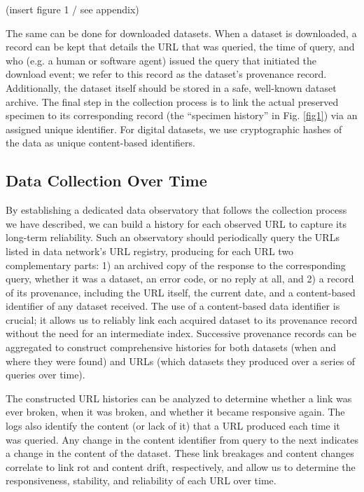 \documentclass[12pt,letterpaper]{article}
\begin{document}
% 
(insert figure 1 / see appendix)

The same can be done for downloaded datasets. When a dataset is downloaded, a record can be kept that details the URL that was queried, the time of query, and who (e.g. a human or software agent) issued the query that initiated the download event; we refer to this record as the dataset’s provenance record. Additionally, the dataset itself should be stored in a safe, well-known dataset archive. The final step in the collection process is to link the actual preserved specimen to its corresponding record (the “specimen history” in Fig. \ref{fig1}) via an assigned unique identifier. For digital datasets, we use cryptographic hashes of the data as unique content-based identifiers.

\subsection*{Data Collection Over Time}

By establishing a dedicated data observatory that follows the collection process we have described, we can build a history for each observed URL to capture its long-term reliability. Such an observatory should periodically query the URLs listed in data network’s URL registry, producing for each URL two complementary parts: 1) an archived copy of the response to the corresponding query, whether it was a dataset, an error code, or no reply at all, and 2) a record of its provenance, including the URL itself, the current date, and a content-based identifier of any dataset received. The use of a content-based data identifier is crucial; it allows us to reliably link each acquired dataset to its provenance record without the need for an intermediate index. Successive provenance records can be aggregated to construct comprehensive histories for both datasets (when and where they were found) and URLs (which datasets they produced over a series of queries over time).

The constructed URL histories can be analyzed to determine whether a link was ever broken, when it was broken, and whether it became responsive again. The logs also identify the content (or lack of it) that a URL produced each time it was queried. Any change in the content identifier from query to the next indicates a change in the content of the dataset. These link breakages and content changes correlate to link rot and content drift, respectively, and allow us to determine the responsiveness, stability, and reliability of each URL over time. 
\end{document}
